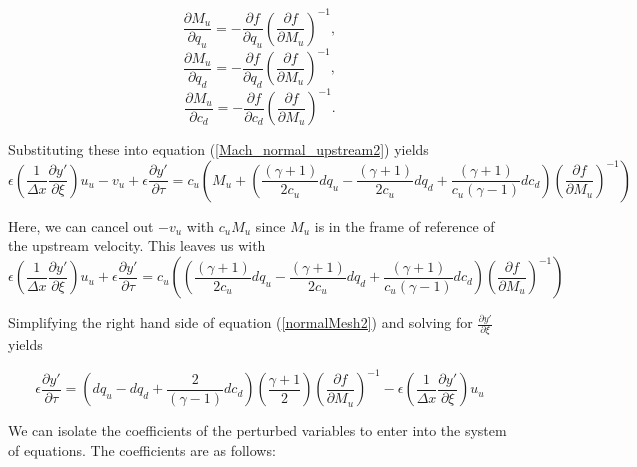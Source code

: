 \documentclass[10pt]{article}
\begin{document}
	\begin{equation}
		\frac{\partial M_u}{\partial q_u} = - \frac{\partial f}{\partial q_u} \left( \frac{\partial f}{\partial M_u} \right)^{-1},
	\end{equation}
	\begin{equation}
		\frac{\partial M_u}{\partial q_d} = - \frac{\partial f}{\partial q_d} \left( \frac{\partial f}{\partial M_u} \right)^{-1},
	\end{equation}
	\begin{equation}
		\frac{\partial M_u}{\partial c_d} = - \frac{\partial f}{\partial c_d} \left( \frac{\partial f}{\partial M_u} \right)^{-1}.
	\end{equation}

	Substituting these into equation (\ref{Mach_normal_upstream2}) yields
	\begin{equation}
		\epsilon \left(\frac{1}{\Delta x} \frac{\partial y'}{\partial \xi} \right) u_u - v_u + \epsilon \frac{\partial y'}{\partial \tau} = c_u \left( M_u + \left( \frac{(\gamma +1)}{2c_u} dq_u - \frac{(\gamma +1)}{2c_u} dq_d +  \frac{(\gamma +1)}{c_u(\gamma - 1)} dc_d \right) \left( \frac{\partial f}{\partial M_u} \right)^{-1}  \right)
	\end{equation}
	
	Here, we can cancel out $-v_u$ with $c_uM_u$ since $M_u$ is in the frame of reference of the upstream velocity. This leaves us with 
	\begin{equation} \label{normalMesh2}
		\epsilon \left(\frac{1}{\Delta x} \frac{\partial y'}{\partial \xi} \right) u_u + \epsilon \frac{\partial y'}{\partial \tau} = c_u\left( \left( \frac{(\gamma +1)}{2c_u} dq_u - \frac{(\gamma +1)}{2c_u} dq_d +  \frac{(\gamma +1)}{c_u(\gamma - 1)} dc_d \right) \left( \frac{\partial f}{\partial M_u} \right)^{-1}  \right)
	\end{equation}
	
	Simplifying the right hand side of equation (\ref{normalMesh2}) and solving for $\frac{\partial y'}{\partial \xi}$ yields
	
	\begin{equation} \label{dypdtau}
		 \epsilon \frac{\partial y'}{\partial \tau} = \left( dq_u - dq_d +  \frac{2}{(\gamma - 1)} dc_d \right) \left( \frac{\gamma + 1}{2} \right) \left( \frac{\partial f}{\partial M_u} \right)^{-1} - \epsilon \left(\frac{1}{\Delta x} \frac{\partial y'}{\partial \xi} \right) u_u
	\end{equation}
	
	We can isolate the coefficients of the perturbed variables to enter into the system of equations. The coefficients are as follows:
	
\end{document}
